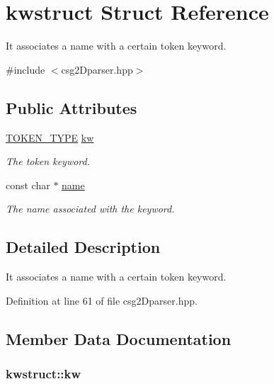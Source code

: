 \hypertarget{structkwstruct}{
\section{kwstruct Struct Reference}
\label{structkwstruct}
}


It associates a name with a certain token keyword.  




{\ttfamily \#include $<$csg2Dparser.hpp$>$}

\subsection*{Public Attributes}
\begin{DoxyCompactItemize}
\item 
\hyperlink{csg2_dparser_8hpp_abbf72a04a030b0407c2a0d547f84e12d}{TOKEN\_\-TYPE} \hyperlink{structkwstruct_addcd406ba35cf2316fb7085b3bbf073a}{kw}
\begin{DoxyCompactList}\small\item\em The token keyword. \item\end{DoxyCompactList}\item 
const char $\ast$ \hyperlink{structkwstruct_a2e2497a18afa4c1a9dca03f6007f2713}{name}
\begin{DoxyCompactList}\small\item\em The name associated with the keyword. \item\end{DoxyCompactList}\end{DoxyCompactItemize}


\subsection{Detailed Description}
It associates a name with a certain token keyword. 

Definition at line 61 of file csg2Dparser.hpp.



\subsection{Member Data Documentation}
\hypertarget{structkwstruct_addcd406ba35cf2316fb7085b3bbf073a}{
\subsubsection[{kw}]{ {\bf kwstruct::kw}}}
\label{structkwstruct_addcd406ba35cf2316fb7085b3bbf073a}


